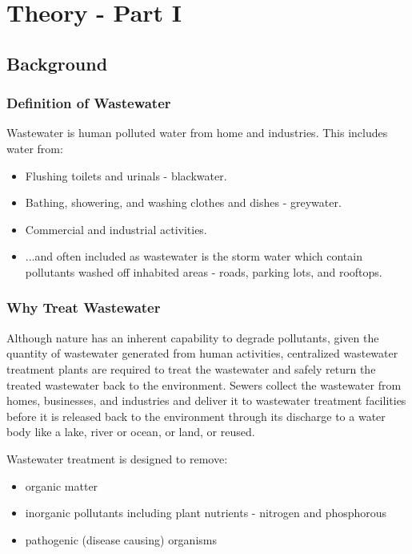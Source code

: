 
\chapter{Theory - Part I}

\section{Background}
\subsection{Definition of Wastewater}

Wastewater is human polluted water from home and industries. This includes water from:
\begin{itemize}
\item Flushing toilets and urinals  - blackwater.
\item Bathing, showering, and washing clothes and dishes  - greywater.
\item Commercial and industrial activities.
\item ...and often included as wastewater is the storm water which contain pollutants washed off inhabited areas - roads, parking lots, and rooftops.
\end{itemize}

\subsection{Why Treat Wastewater}
Although nature has an inherent capability to degrade pollutants, given the quantity of wastewater generated from human activities, centralized wastewater treatment plants are required to treat the wastewater and safely return the treated wastewater back to the environment.  Sewers collect the wastewater from homes, businesses, and industries and deliver it to wastewater treatment facilities before it is released back to the environment through its discharge to a water body like a lake, river or ocean, or land, or reused. 

Wastewater treatment is designed to remove:
\begin{itemize}
\item organic matter
\item inorganic  pollutants including plant nutrients - nitrogen and phosphorous\\
\item pathogenic (disease causing) organisms\\
\end{itemize}

